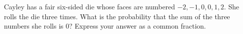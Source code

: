 Cayley has a fair six-sided die whose faces are numbered $-2,-1,0,0,1,2$. She rolls the die three times. What is the probability that the sum of the three numbers she rolls is $0$? Express your answer as a common fraction.
